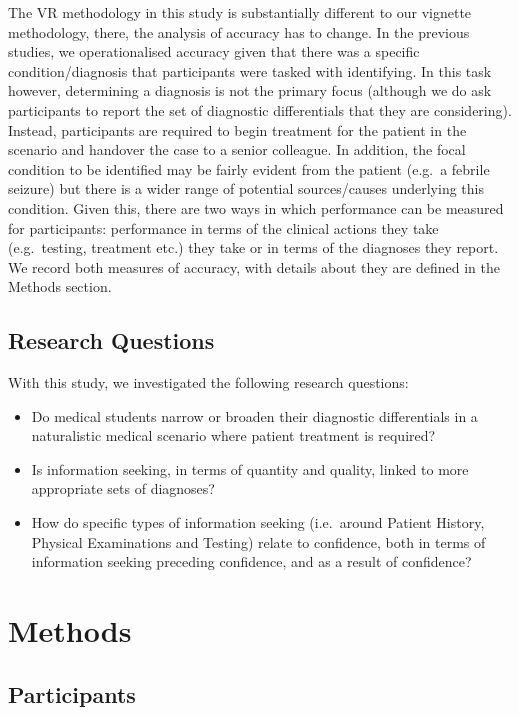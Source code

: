 \documentclass[a4paper, nobind]{templates/ociamthesis}
\providecommand{\tightlist}{%
  \setlength{\itemsep}{0pt}\setlength{\parskip}{0pt}}
\begin{document}
\hfill\break
The VR methodology in this study is substantially different to our vignette methodology, there, the analysis of accuracy has to change. In the previous studies, we operationalised accuracy given that there was a specific condition/diagnosis that participants were tasked with identifying. In this task however, determining a diagnosis is not the primary focus (although we do ask participants to report the set of diagnostic differentials that they are considering). Instead, participants are required to begin treatment for the patient in the scenario and handover the case to a senior colleague. In addition, the focal condition to be identified may be fairly evident from the patient (e.g.~a febrile seizure) but there is a wider range of potential sources/causes underlying this condition. Given this, there are two ways in which performance can be measured for participants: performance in terms of the clinical actions they take (e.g.~testing, treatment etc.) they take or in terms of the diagnoses they report. We record both measures of accuracy, with details about they are defined in the Methods section.

\subsection{Research Questions}\label{research-questions}

With this study, we investigated the following research questions:

\begin{itemize}
\tightlist
\item
  Do medical students narrow or broaden their diagnostic differentials in a naturalistic medical scenario where patient treatment is required?
\item
  Is information seeking, in terms of quantity and quality, linked to more appropriate sets of diagnoses?
\item
  How do specific types of information seeking (i.e.~around Patient History, Physical Examinations and Testing) relate to confidence, both in terms of information seeking preceding confidence, and as a result of confidence?
\end{itemize}

\section{Methods}\label{methods}

\subsection{Participants}\label{participants}
\end{document}
